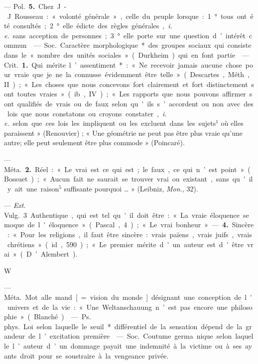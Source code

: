 \begin{itemize}[leftmargin=1cm, label=, itemsep=1pt]
— \si{Pol.}  {\bf 5.} Chez J.-J. Rousseau :
« volonté générale », celle du peuple
lorsque : 1° tous ont été consultés;
2° elle édicte des règles générales,
{\it i. e.} sans acception de personnes;
3° elle porte sur une question d’intérêt commun.

 — \si{Soc.} Caractère morphologique* des groupes sociaux
qui consiste dans le « nombre des
unités sociales » (Durkheim) qui en
font partie.

 — \si{Crit.} {\bf 1.} Qui mérite l’assentiment* : « Ne recevoir jamais aucune
chose pour vraie que je ne la connusse évidemment être telle » (Descartes, Méth., II) ; « Les choses que
nous concevons fort clairement et
fort distinctement sont toutes
vraies » (ib., IV) ; « Les rapports que
nous pouvons affirmer sont qualifiés de vrais ou de faux selon qu'ils
s’accordent ou non avec des lois que
nous constatons ou croyons constater, {\it i. e.} selon que ces lois les impliquent ou les excluent dans les
sujets$^1$ où elles paraissent » (Renouvier) ; « Une géométrie ne peut pas
être plus vraie qu’une autre; elle
peut seulement être plus commode »
(Poincaré).

— \si{Méta.}  {\bf 2.} Réel : « Le vrai est ce
qui est; le faux, ce qui n’est point »
(Bossuet) ; « Aucun fait ne saurait
se trouver vrai ou existant, sans
qu'il y ait une raison$^5$ suffisante
pourquoi … » (Leibniz, {\it Mon.}, 32).

— {\it Ext.} \si{Vulg.} 3 Authentique,
qui est tel qu'il doit être : « La vraie
éloquence se moque de l'éloquence »
(Pascal, 4) ; « Le vrai bonheur ». —
 {\bf 4.} Sincère : « Pour les religions, il
faut être sincère : vrais païens, vrais
juifs, vrais chrétiens » (id, 590) ;
« Le premier mérite d'un auteur est
d’être vrai » (D’Alembert).

\begin{center}
W
\end{center}

 — \si{Méta.} Mot alle
mand [= vision du monde] désignant une conception de l'univers
et de la vie : « Une Weltanschauung
n’est pas encore une philosophie »
(Blanché).

 — \si{Ps. phys.} Loi selon
laquelle le seuil* différentiel de la
sensation dépend de la grandeur de
l’excitation première.

 — \si{Soc.} Coutume germa
nique selon laquelle l’auteur d’un
dommage payait une indemnité à
la victime ou à ses ayants droit pour
se soustraire à la vengeance privée.


\end{itemize}
